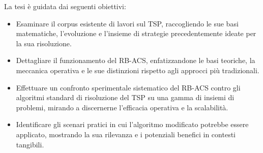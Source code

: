 La tesi è guidata dai seguenti obiettivi:

\begin{itemize}
	\item Esaminare il corpus esistente di lavori sul \gls{TSP}, raccogliendo le sue basi matematiche, l'evoluzione e l'insieme di strategie precedentemente ideate per la sua risoluzione.
  \item Dettagliare il funzionamento del \gls{RB-ACS}, enfatizzandone le basi teoriche, la meccanica operativa e le sue distinzioni rispetto agli approcci più tradizionali.
  \item Effettuare un confronto sperimentale sistematico del \gls{RB-ACS} contro gli algoritmi standard di risoluzione del \gls{TSP} su una gamma di insiemi di problemi, mirando a discernerne l'efficacia operativa e la scalabilità.
	\item Identificare gli scenari pratici in cui l'algoritmo modificato potrebbe essere applicato, mostrando la sua rilevanza e i potenziali benefici in contesti tangibili.
\end{itemize}





